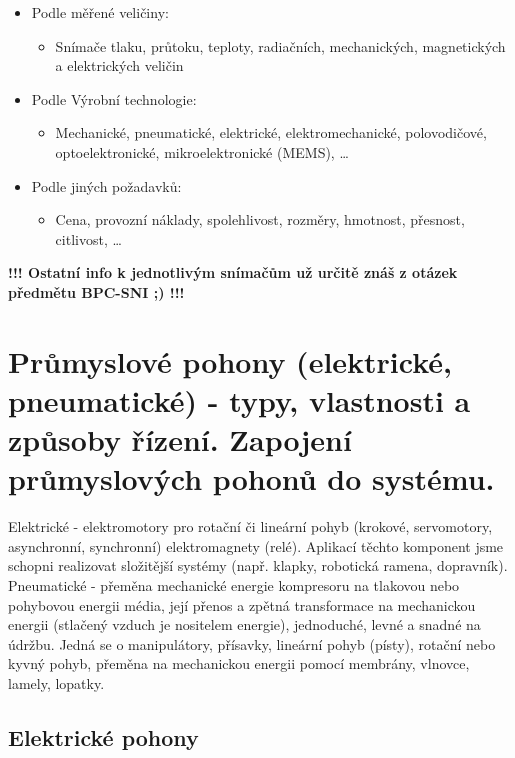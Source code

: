 \begin{itemize}
    \item Podle měřené veličiny: \begin{itemize}
              \item Snímače tlaku, průtoku, teploty, radiačních, mechanických, magnetických a elektrických veličin
          \end{itemize}
    \item Podle Výrobní technologie: \begin{itemize}
              \item Mechanické, pneumatické, elektrické, elektromechanické, polovodičové, optoelektronické, mikroelektronické (MEMS), \dots
          \end{itemize}
    \item Podle jiných požadavků: \begin{itemize}
              \item Cena, provozní náklady, spolehlivost, rozměry, hmotnost, přesnost, citlivost, \dots
          \end{itemize}
\end{itemize}

\textbf{!!! Ostatní info k jednotlivým snímačům už určitě znáš z otázek předmětu BPC-SNI ;) !!!
}

\section{Průmyslové pohony (elektrické, pneumatické) - typy, vlastnosti a způsoby řízení. Zapojení průmyslových pohonů do
  systému.}
Elektrické - elektromotory pro rotační či lineární pohyb (krokové, servomotory, asynchronní, synchronní) elektromagnety (relé). Aplikací těchto komponent jsme schopni realizovat složitější systémy (např. klapky, robotická ramena, dopravník).
\\
Pneumatické - přeměna mechanické energie kompresoru na tlakovou nebo pohybovou energii média, její přenos a zpětná transformace na mechanickou energii (stlačený vzduch je nositelem energie), jednoduché, levné a snadné na údržbu. Jedná se o manipulátory, přísavky, lineární pohyb (písty), rotační nebo kyvný pohyb, přeměna na mechanickou energii pomocí membrány, vlnovce, lamely, lopatky.

\subsection{Elektrické pohony}
